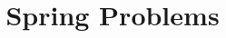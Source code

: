 \documentclass{ximera}
\title[Dig-In:]{Spring Problems}
\begin{document}
\begin{abstract}
  
\end{abstract}
\maketitle
\end{document}
